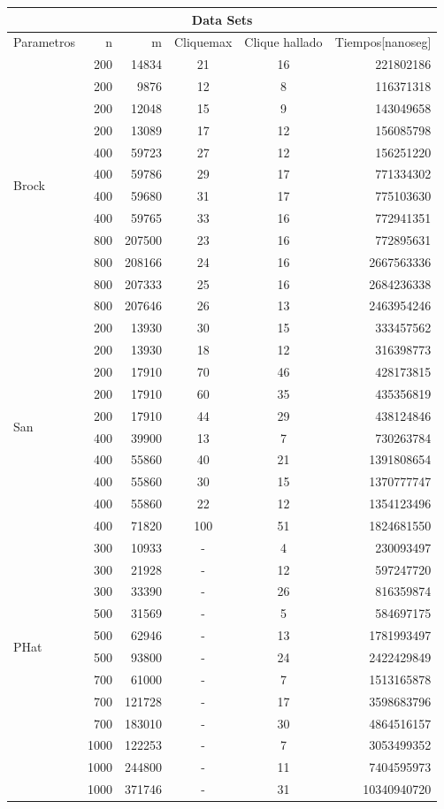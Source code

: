 \begin{tabular}{|l|r|r|c|c|r|} 
\hline \multicolumn{6}{|c|}{Data Sets} \\ 
\hline
Parametros & n & m & Cliquemax & Clique hallado & Tiempos[nanoseg] \\ 
\hline \multirow{12}{*}{Brock} 
& 200 & 14834 & 21& 16& 221802186 \\
& 200 & 9876& 12& 8&116371318 \\
& 200& 12048& 15& 9&143049658\\
& 200& 13089& 17& 12& 156085798\\
& 400& 59723& 27& 12& 156251220\\
& 400& 59786& 29& 17& 771334302\\
& 400& 59680& 31& 17& 775103630\\
& 400& 59765& 33& 16& 772941351\\
& 800& 207500& 23& 16& 772895631\\
& 800& 208166& 24& 16& 2667563336\\
& 800& 207333& 25& 16&2684236338\\
& 800& 207646& 26& 13&2463954246\\
\hline \multirow{10}{*}{San} 
& 200 & 13930& 30& 15& 333457562\\
& 200& 13930& 18& 12& 316398773\\
& 200& 17910& 70& 46& 428173815\\
& 200 & 17910& 60& 35& 435356819\\
& 200& 17910& 44& 29& 438124846\\
& 400& 39900& 13& 7& 730263784\\
& 400& 55860& 40& 21& 1391808654\\
& 400& 55860& 30& 15& 1370777747\\
& 400& 55860& 22& 12& 1354123496\\
& 400& 71820& 100& 51& 1824681550 \\
\hline \multirow{10}{*}{PHat} 	
& 300& 10933& -& 4&	230093497 \\
& 300& 21928& -& 12& 597247720 \\
& 300& 33390& -& 26& 816359874  \\
& 500& 31569& -& 5& 584697175 \\
& 500& 62946& -& 13& 1781993497  \\
& 500& 93800& -& 24& 2422429849 \\
& 700& 61000& -& 7& 1513165878 \\
& 700& 121728& -& 17& 3598683796 \\
& 700& 183010& -& 30& 4864516157 \\ 
& 1000& 122253& -& 7& 3053499352 \\
& 1000& 244800& -& 11& 7404595973 \\
& 1000& 371746& -& 31& 10340940720 \\
\hline 
\end{tabular} 

